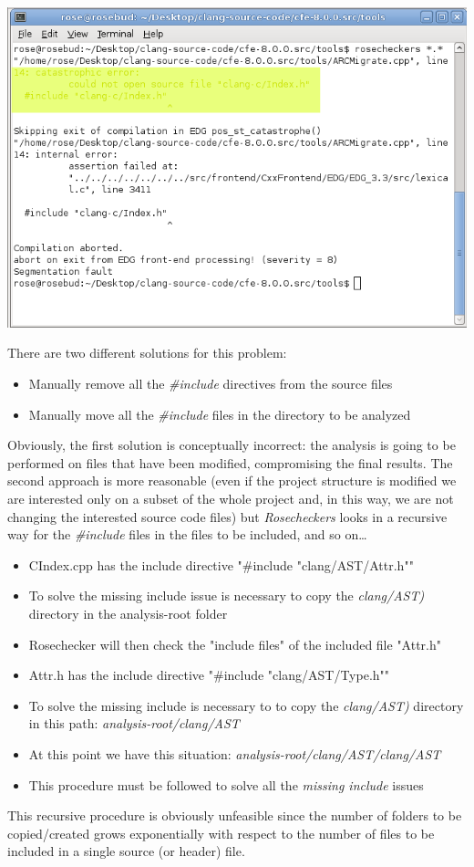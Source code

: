 \begin{minipage}{\linewidth}
	\includegraphics[width=\textwidth]{img/rosechecker-error.png}
\end{minipage}
\pagebreak

There are two different solutions for this problem:
\begin{itemize}
	\item Manually remove all the \textsl{\#include} directives from the source files
	\item Manually move all the \textsl{\#include} files in the directory to be analyzed
\end{itemize}

Obviously, the first solution is conceptually incorrect: the analysis is going to be performed on files that have been modified, compromising the final results.\newline
The second approach is more reasonable (even if the project structure is modified we are interested only on a subset of the whole project and, in this way, we are not changing the interested source code files) but \textsl{Rosecheckers} looks in a recursive way for the \textsl{\#include} files in the files to be included, and so on\dots\newline\newline
[e.g.]
\begin{itemize}
	\item CIndex.cpp has the include directive "\#include "clang/AST/Attr.h""
	\item To solve the missing include issue is necessary to copy the \textsl{clang/AST)} directory in the analysis-root folder
	\item Rosechecker will then check the "include files" of the included file "Attr.h"
	\item Attr.h has the include directive "\#include "clang/AST/Type.h""
	\item To solve the missing include is necessary to to copy the \textsl{clang/AST)} directory in this path: \textsl{analysis-root/clang/AST}
	\item At this point we have this situation: \textsl{analysis-root/clang/AST/clang/AST}
	\item This procedure must be followed to solve all the \textsl{missing include} issues
\end{itemize}

This recursive procedure is obviously unfeasible since the number of folders to be copied/created grows exponentially with respect to the number of files to be included in a single source (or header) file.